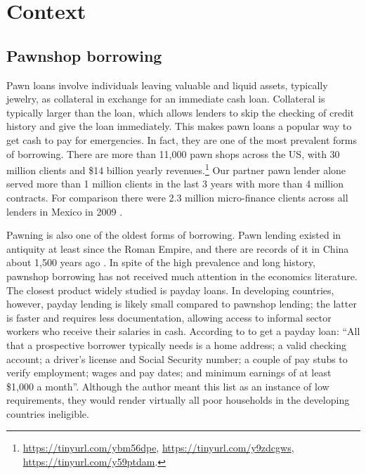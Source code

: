 \documentclass[oneside,11pt]{article}
\begin{document}


\section{Context} \label{context}

\subsection{Pawnshop borrowing}
    
Pawn loans involve individuals leaving valuable and liquid assets, typically jewelry, as collateral in exchange for an immediate cash loan. Collateral is typically larger than the loan, which allows lenders to skip the checking of credit history and give the loan immediately. This makes pawn loans a popular way to get cash to pay for emergencies. In fact, they are one of the most prevalent forms of borrowing. There are more than 11,000 pawn shops across the US, with 30 million clients and \$14 billion yearly revenues.\footnote{\url{https://tinyurl.com/ybm56dpe}, \url{https://tinyurl.com/y9zdcgws}, \url{https://tinyurl.com/y59ptdam}.} Our partner pawn lender alone served more than 1 million clients in the last 3 years with more than 4 million contracts. For comparison there were 2.3 million micro-finance clients across all lenders in Mexico in 2009 \citep{Pedroza:2010}. 

Pawning is also one of the oldest forms of borrowing. Pawn lending existed in antiquity at least since the Roman Empire, and there are records of it in China about 1,500 years ago \citep{PawnShops}. In spite of the high prevalence and long history, pawnshop borrowing has not received much attention in the economics literature. The closest product widely studied is payday loans. In developing countries, however, payday lending is likely small compared to pawnshop lending; the latter is faster and requires less documentation, allowing access to informal sector workers who receive their salaries in cash. According to \cite{Payday} to get a payday loan: ``All that a prospective borrower typically needs is a home address; a valid checking account; a driver’s license and Social Security number; a couple of pay stubs to verify employment; wages and pay dates; and minimum earnings of at least \$1,000 a month''. Although the author meant this list as an instance of low requirements, they would render virtually all poor households in the developing countries ineligible. 
\end{document}
